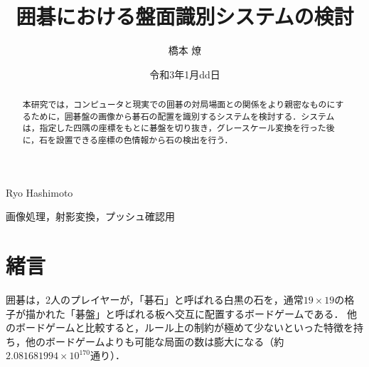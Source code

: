 \documentclass[openright]{nitocs}
\numberwithin{equation}{section}
\begin{document}
    \title{囲碁における盤面識別システムの検討}  %
    \author{橋本 燎}{Ryo Hashimoto} %
    \date{令和3年1月dd日}   %

    \begin{abstract} %
        本研究では，コンピュータと現実での囲碁の対局場面との関係をより親密なものにするために，囲碁盤の画像から碁石の配置を識別するシステムを検討する．システムは，指定した四隅の座標をもとに碁盤を切り抜き，グレースケール変換を行った後に，石を設置できる座標の色情報から石の検出を行う．\\
    \end{abstract}

    \begin{keyword} %
        画像処理，射影変換，プッシュ確認用
    \end{keyword}


    \maketitle

    \section{緒言}  
    \label{sec:format}
        囲碁は，2人のプレイヤーが，「碁石」と呼ばれる白黒の石を，通常$19\times19$の格子が描かれた「碁盤」と呼ばれる板へ交互に配置するボードゲームである．
        他のボードゲームと比較すると，ルール上の制約が極めて少ないといった特徴を持ち，他のボードゲームよりも可能な局面の数は膨大になる（約$2.081681994 \times 10^{170}$通り\cite{numbers}）．
\end{document}
